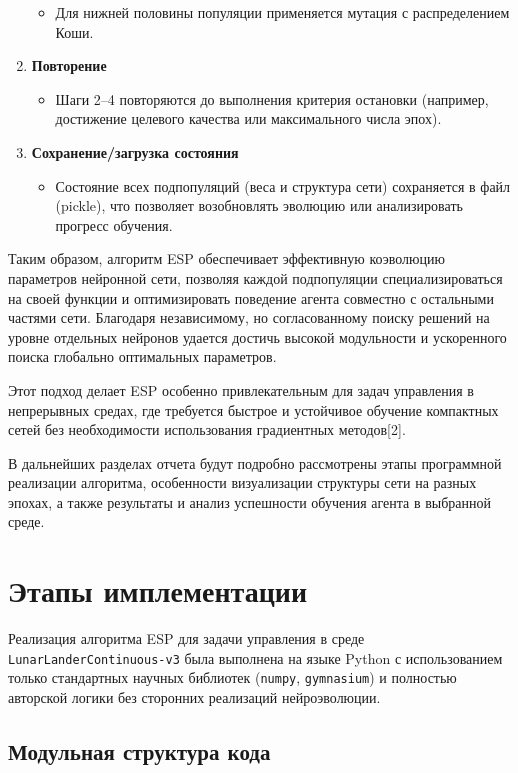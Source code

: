 \documentclass[a4paper,12pt]{article}
\begin{document}
\begin{enumerate}
\begin{itemize}
		\item Для нижней половины популяции применяется мутация с распределением Коши.
	\end{itemize}
	\item \textbf{Повторение}
	\begin{itemize}
		\item Шаги 2--4 повторяются до выполнения критерия остановки (например, достижение целевого качества или максимального числа эпох).
	\end{itemize}
	\item \textbf{Сохранение/загрузка состояния}
	\begin{itemize}
		\item Состояние всех подпопуляций (веса и структура сети) сохраняется в файл (pickle), что позволяет возобновлять эволюцию или анализировать прогресс обучения.
	\end{itemize}
\end{enumerate}

Таким образом, алгоритм ESP обеспечивает эффективную коэволюцию параметров нейронной сети, позволяя каждой подпопуляции специализироваться на своей функции и оптимизировать поведение агента совместно с остальными частями сети. Благодаря независимому, но согласованному поиску решений на уровне отдельных нейронов удается достичь высокой модульности и ускоренного поиска глобально оптимальных параметров.

Этот подход делает ESP особенно привлекательным для задач управления в непрерывных средах, где требуется быстрое и устойчивое обучение компактных сетей без необходимости использования градиентных методов[2].

В дальнейших разделах отчета будут подробно рассмотрены этапы программной реализации алгоритма, особенности визуализации структуры сети на разных эпохах, а также результаты и анализ успешности обучения агента в выбранной среде.
\newpage
\section{Этапы имплементации}

Реализация алгоритма ESP для задачи управления в среде \texttt{LunarLanderContinuous-v3} была выполнена на языке Python с использованием только стандартных научных библиотек (\texttt{numpy}, \texttt{gymnasium}) и полностью авторской логики без сторонних реализаций нейроэволюции.

\subsection{Модульная структура кода}
\end{document}
